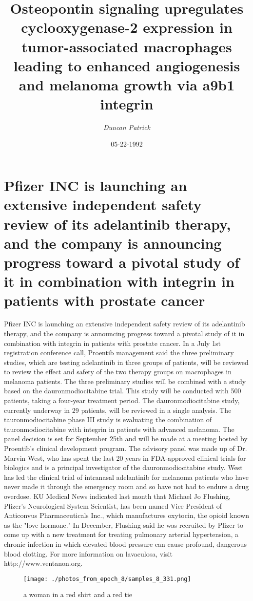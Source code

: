 \documentclass{article}%
\title{Osteopontin signaling upregulates cyclooxygenase{-}2 expression in tumor{-}associated macrophages leading to enhanced angiogenesis and melanoma growth via a9b1 integrin}%
\author{\textit{Duncan Patrick}}%
\date{05-22-1992}%
\begin{document}
%
\normalsize%
\maketitle%
\section{Pfizer INC is launching an extensive independent safety review of its adelantinib therapy, and the company is announcing progress toward a pivotal study of it in combination with integrin in patients with prostate cancer}%
\label{sec:PfizerINCislaunchinganextensiveindependentsafetyreviewofitsadelantinibtherapy,andthecompanyisannouncingprogresstowardapivotalstudyofitincombinationwithintegrininpatientswithprostatecancer}%
Pfizer INC is launching an extensive independent safety review of its adelantinib therapy, and the company is announcing progress toward a pivotal study of it in combination with integrin in patients with prostate cancer.\newline%
In a July 1st registration conference call, Proentib management said the three preliminary studies, which are testing adelantinib in three groups of patients, will be reviewed to review the effect and safety of the two therapy groups on macrophages in melanoma patients. The three preliminary studies will be combined with a study based on the dauronmodiocitabine trial. This study will be conducted with 500 patients, taking a four{-}year treatment period. The dauronmodiocitabine study, currently underway in 29 patients, will be reviewed in a single analysis. The tauronmodiocitabine phase III study is evaluating the combination of tauronmodiocitabine with integrin in patients with advanced melanoma.\newline%
The panel decision is set for September 25th and will be made at a meeting hosted by Proentib's clinical development program. The advisory panel was made up of Dr. Marvin West, who has spent the last 20 years in FDA{-}approved clinical trials for biologics and is a principal investigator of the dauronmodiocitabine study. West has led the clinical trial of intranasal adelantinib for melanoma patients who have never made it through the emergency room and so have not had to endure a drug overdose.\newline%
KU Medical News indicated last month that Michael Jo Flushing, Pfizer's Neurological System Scientist, has been named Vice President of Anticonvus Pharmaceuticals Inc., which manufactures oxytocin, the opioid known as the "love hormone." In December, Flushing said he was recruited by Pfizer to come up with a new treatment for treating pulmonary arterial hypertension, a chronic infection in which elevated blood pressure can cause profound, dangerous blood clotting. For more information on lavaculosa, visit http://www.ventanon.org.\newline%

%


\begin{figure}[h!]%
\centering%
\texttt{[image: ./photos\_from\_epoch\_8/samples\_8\_331.png]}%
\caption{a woman in a red shirt and a red tie}%
\end{figure}

%
\end{document}
